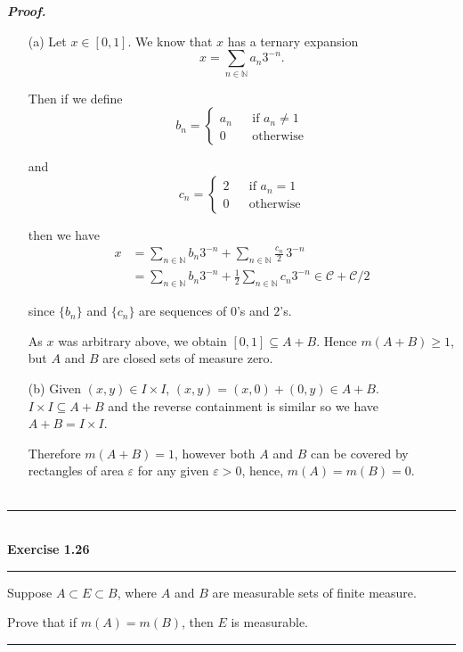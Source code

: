 \documentclass[a4paper,11pt]{article}
\begin{document}
\textbf{\textit{Proof.}}
\begin{enumerate}
	\item [(a)] Let $x \in [0,1]$. We know that $x$ has a ternary expansion
		$$x = \sum_{n \in \mathbb{N}} a_n 3^{-n}.$$

	Then if we define
		$$b_n = \left\{
		\begin{matrix}
		a_n & &\text{if }a_n \neq 1\\
		0 & &\text{otherwise}
		\end{matrix} \right.$$

	and
		$$c_n = \left\{
		\begin{matrix}
		2 & &\text{if }a_n = 1\\
		0 & &\text{otherwise}
		\end{matrix} \right.$$

	then we have
		$$\begin{aligned}
		x
		&= \sum_{n \in \mathbb{N}} b_n 3^{-n}
		+ \sum_{n \in \mathbb{N}} \frac{c_n}{2}\,3^{-n}\\
		&= \sum_{n \in \mathbb{N}} b_n 3^{-n}
		+ \frac{1}{2} \sum_{n \in \mathbb{N}} c_n 3^{-n}
		\in \mathcal{C} + \mathcal{C}/2
		\end{aligned}$$

	since $\{b_n\}$ and $\{c_n\}$ are sequences of $0$'s and $2$'s.

	As $x$ was arbitrary above, we obtain $[0,1] \subseteq A + B$. Hence $m(A + B) \geq 1$, but $A$ and $B$ are closed sets of measure zero.\\

	\item [(b)] Given $(x,y) \in I \times I$, $(x,y) = (x,0) + (0,y) \in A + B$. $I \times I \subseteq A + B$ and the reverse containment is similar so we have $A + B = I \times I$.

	Therefore $m(A + B) = 1$, however both $A$ and $B$ can be covered by rectangles of area $\varepsilon$ for any given $\varepsilon > 0$, hence, $m(A) = m(B) = 0$.\\\\
\end{enumerate}


\begin{flushleft}
	\rule[-0.5ex]{17cm}{2pt}\\
		\textbf{Exercise 1.26}\\
	\rule[1.5ex]{17cm}{0.5pt}
		Suppose $A \subset E \subset B$, where $A$ and $B$ are measurable sets of finite measure.

		Prove that if $m(A) = m(B)$, then $E$ is measurable.
	\rule[1.0ex]{17cm}{0.5pt}\
\end{flushleft}
\end{document}
